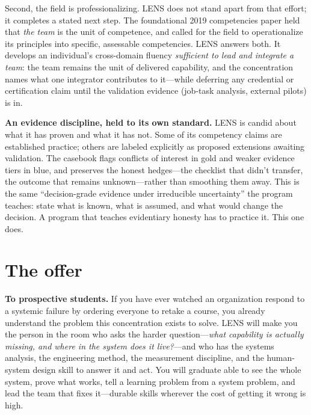 \documentclass[11pt]{article}
\newcommand{\lead}[1]{{\color{lensaccent}\bfseries #1}}
\begin{document}
Second, the field is professionalizing. LENS does not stand apart from that effort; it completes a stated next step. The foundational 2019 competencies paper held that \emph{the team} is the unit of competence, and called for the field to operationalize its principles into specific, assessable competencies. LENS answers both. It develops an individual's cross-domain fluency \emph{sufficient to lead and integrate a team}: the team remains the unit of delivered capability, and the concentration names what one integrator contributes to it---while deferring any credential or certification claim until the validation evidence (job-task analysis, external pilots) is in.

\begin{softbox}
\textbf{An evidence discipline, held to its own standard.} LENS is candid about what it has proven and what it has not. Some of its competency claims are established practice; others are labeled explicitly as proposed extensions awaiting validation. The casebook flags conflicts of interest in gold and weaker evidence tiers in blue, and preserves the honest hedges---the checklist that didn't transfer, the outcome that remains unknown---rather than smoothing them away. This is the same ``decision-grade evidence under irreducible uncertainty'' the program teaches: state what is known, what is assumed, and what would change the decision. A program that teaches evidentiary honesty has to practice it. This one does.
\end{softbox}

\section{The offer}

\lead{To prospective students.} If you have ever watched an organization respond to a systemic failure by ordering everyone to retake a course, you already understand the problem this concentration exists to solve. LENS will make you the person in the room who asks the harder question---\emph{what capability is actually missing, and where in the system does it live?}---and who has the systems analysis, the engineering method, the measurement discipline, and the human-system design skill to answer it and act. You will graduate able to see the whole system, prove what works, tell a learning problem from a system problem, and lead the team that fixes it---durable skills wherever the cost of getting it wrong is high.
\end{document}
